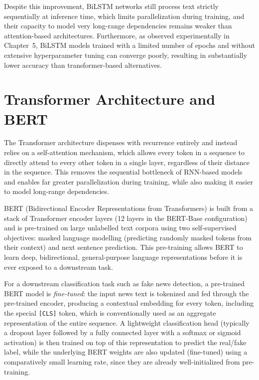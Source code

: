 Despite this improvement, BiLSTM networks still process text strictly sequentially at inference time, which limits parallelization during training, and their capacity to model very long-range dependencies remains weaker than attention-based architectures. Furthermore, as observed experimentally in Chapter~5, BiLSTM models trained with a limited number of epochs and without extensive hyperparameter tuning can converge poorly, resulting in substantially lower accuracy than transformer-based alternatives.

\section{Transformer Architecture and BERT}

The Transformer architecture dispenses with recurrence entirely and instead relies on a self-attention mechanism, which allows every token in a sequence to directly attend to every other token in a single layer, regardless of their distance in the sequence. This removes the sequential bottleneck of RNN-based models and enables far greater parallelization during training, while also making it easier to model long-range dependencies.

BERT (Bidirectional Encoder Representations from Transformers) is built from a stack of Transformer encoder layers (12 layers in the BERT-Base configuration) and is pre-trained on large unlabelled text corpora using two self-supervised objectives: masked language modelling (predicting randomly masked tokens from their context) and next sentence prediction. This pre-training allows BERT to learn deep, bidirectional, general-purpose language representations before it is ever exposed to a downstream task.

For a downstream classification task such as fake news detection, a pre-trained BERT model is \textit{fine-tuned}: the input news text is tokenized and fed through the pre-trained encoder, producing a contextual embedding for every token, including the special \texttt{[CLS]} token, which is conventionally used as an aggregate representation of the entire sequence. A lightweight classification head (typically a dropout layer followed by a fully connected layer with a softmax or sigmoid activation) is then trained on top of this representation to predict the real/fake label, while the underlying BERT weights are also updated (fine-tuned) using a comparatively small learning rate, since they are already well-initialized from pre-training.

